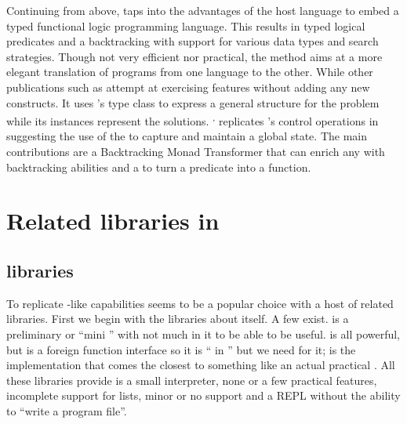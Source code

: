 \documentclass[thesis-solanki.tex]{subfiles}
\begin{document}
Continuing from above, \cite{claessen2000typed} taps into the advantages of the host language to embed a typed
functional logic programming language.
This results in typed logical predicates and a backtracking  with support for various data
types and search strategies.
Though not very efficient nor practical,
the method aims at a more elegant translation of programs from one language
to the other.
While other publications such as \cite{erwig2004escape} attempt at exercising  features without adding any new 
constructs. 
It uses 's type class to express a general structure for the problem while its instances represent the solutions. 
\textsuperscript{,}
\cite{hinze1998prological} replicates 's control operations in  suggesting the
use of the   to capture and maintain a global state.
The main contributions are a Backtracking Monad Transformer that can enrich any  with
backtracking abilities and a  to turn a  predicate into a
 function.



\section{Related libraries in }
\subsection{ libraries}

To replicate -like
capabilities  seems to be a popular choice
with a host of related libraries.
First we begin with the libraries about  itself.
A few exist. \cite{nanoprolog-lib} is a preliminary or
``mini '' with not much in it to be able to be useful. \cite{hswip-lib}
is all powerful, but is a foreign function interface so it is `` in '' but we
need  for it;
\cite{prolog-lib}
is the implementation that comes the closest
to something like an actual practical .
All these libraries provide is a small interpreter, none or a few practical features, incomplete support for lists, minor or
no  support and a REPL without the ability to ``write a  program
file''.
\end{document}
